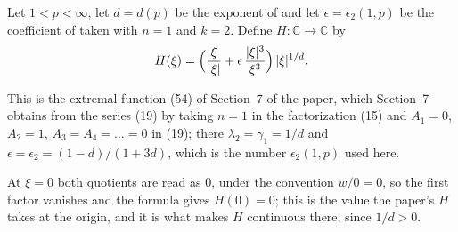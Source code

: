 \begin{definition}
Let $1<p<\infty$, let $d=d(p)$ be the exponent of  and let
$\epsilon=\epsilon_2(1,p)$ be the coefficient of  taken with
$n=1$ and $k=2$.  Define $H\colon\mathbb{C}\to\mathbb{C}$ by
\[
  H(\xi)=\Bigl(\frac{\xi}{|\xi|}+\epsilon\,\frac{|\xi|^3}{\xi^3}\Bigr)\,|\xi|^{1/d}.
\]

This is the extremal function (54) of Section~7 of the paper, which Section~7
obtains from the series (19) by taking $n=1$ in the factorization (15) and
$A_1=0$, $A_2=1$, $A_3=A_4=\dots=0$ in (19); there
$\lambda_2=\gamma_1=1/d$ and $\epsilon=\epsilon_2=(1-d)/(1+3d)$, which is the
number $\epsilon_2(1,p)$ used here.

At $\xi=0$ both quotients are read as $0$, under the convention $w/0=0$, so the
first factor vanishes and the formula gives $H(0)=0$; this is the value the
paper's $H$ takes at the origin, and it is what makes $H$ continuous there,
since $1/d>0$.
\end{definition}

